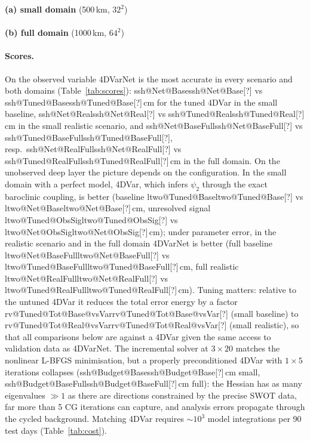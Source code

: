 \documentclass[10pt,a4paper]{article}
\makeatletter
\newcommand{\pend}[1]{\textcolor{orange!80!black}{[#1]}}
\newcommand{\getnum}[1]{\ifcsname #1\endcsname\csname #1\endcsname\else\pend{?}\fi}
\newcommand{\ssh}[2]{\getnum{ssh@#1@#2}}
\newcommand{\ltwo}[2]{\getnum{ltwo@#1@#2}}
\makeatother
\begin{document}
\begin{table}[t]\centering\small
\caption{Test RMSE (cm) of SSH (observed) and of the deep layer (never observed, SSH-equivalent); 4DVarNet: mean
($\pm$ s.d.) over three training seeds where available. Best in bold.}\label{tab:scores}
\textbf{(a) small domain} (500\,km, $32^2$)\\[2pt]
\resizebox{\linewidth}{!}{}\\[6pt]
\textbf{(b) full domain} (1000\,km, $64^2$)\\[2pt]

\end{table}

\paragraph{Scores.} On the observed variable 4DVarNet is the most accurate in every scenario and both domains
(Table~\ref{tab:scores}): \ssh{Net}{Base} vs \ssh{Tuned}{Base}\,cm for the tuned 4DVar in the small baseline,
\ssh{Net}{Real} vs \ssh{Tuned}{Real}\,cm in the small realistic scenario, and \ssh{Net}{BaseFull} vs
\ssh{Tuned}{BaseFull}, resp.\ \ssh{Net}{RealFull} vs \ssh{Tuned}{RealFull}\,cm in the full domain. On the unobserved
deep layer the picture depends on the configuration. In the small domain with a perfect model, 4DVar, which infers
$\psi_2$ through the exact baroclinic coupling, is better (baseline \ltwo{Tuned}{Base} vs \ltwo{Net}{Base}\,cm,
unresolved signal \ltwo{Tuned}{ObsSig} vs \ltwo{Net}{ObsSig}\,cm); under parameter error, in the realistic scenario
and in the full domain 4DVarNet is better (full baseline \ltwo{Net}{BaseFull} vs \ltwo{Tuned}{BaseFull}\,cm, full
realistic \ltwo{Net}{RealFull} vs \ltwo{Tuned}{RealFull}\,cm). Tuning matters: relative to the untuned 4DVar it
reduces the total error energy by a factor \getnum{rv@Tuned@Tot@Base@vsVar} (small baseline) to
\getnum{rv@Tuned@Tot@Real@vsVar} (small realistic), so that all comparisons below are against a 4DVar given the same
access to validation data as 4DVarNet. The incremental solver at $3\times20$ matches the nonlinear L-BFGS
minimisation, but a properly preconditioned 4DVar with $1\times5$ iterations collapses (\ssh{Budget}{Base}\,cm small,
\ssh{Budget}{BaseFull}\,cm full): the Hessian has as many eigenvalues $\gg1$ as there are directions constrained by the
precise SWOT data, far more than 5 CG iterations can capture, and analysis errors propagate through the cycled
background. Matching 4DVar requires $\sim10^3$ model integrations per 90 test days (Table~\ref{tab:cost}).
\end{document}
